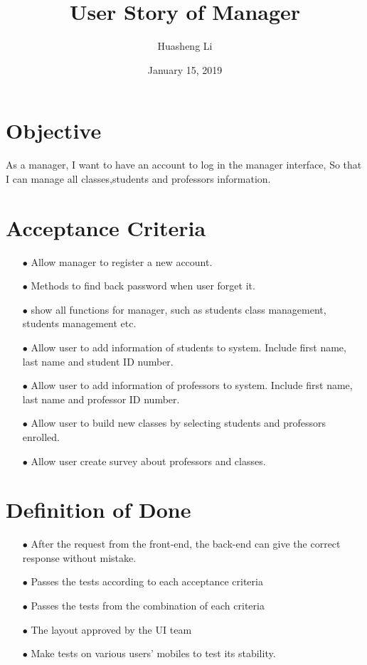\documentclass{article}
\begin{document}
\title{User Story of Manager}
\author{Huasheng Li}
\date{January 15, 2019}
\maketitle
\section*{Objective}
As a manager, I want to have an account to log in the manager interface, So that I can manage all classes,students and professors information.

\section*{Acceptance Criteria}
\begin{itemize}
\item[$\bullet$] Allow manager to register a new account.
\item[$\bullet$] Methods to find back password when user forget it.
\item[$\bullet$] show all functions for manager, such as students class management, students management etc.
\item[$\bullet$] Allow user to add information of students to system. Include first name, last name and student ID number.
\item[$\bullet$] Allow user to add information of professors to system. Include first name, last name and professor ID number.
\item[$\bullet$] Allow user to build new classes by selecting students and professors enrolled.
\item[$\bullet$] Allow user create survey about professors and classes.
\end{itemize}

\section*{Definition of Done}
\begin{itemize}
\item[$\bullet$] After the request from the front-end, the back-end can give the correct response without mistake.
\item[$\bullet$] Passes the tests according to each acceptance criteria
\item[$\bullet$] Passes the tests from the combination of each criteria
\item[$\bullet$] The layout approved by the UI team
\item[$\bullet$] Make tests on various users' mobiles to test its stability.
\end{itemize}
\end{document}
